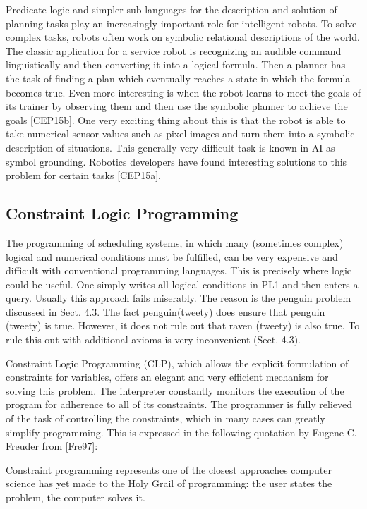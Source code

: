 \documentclass[10pt]{article}
\begin{document}
Predicate logic and simpler sub-languages for the description and solution of planning tasks play an increasingly important role for intelligent robots. To solve complex tasks, robots often work on symbolic relational descriptions of the world. The classic application for a service robot is recognizing an audible command linguistically and then converting it into a logical formula. Then a planner has the task of finding a plan which eventually reaches a state in which the formula becomes true. Even more interesting is when the robot learns to meet the goals of its trainer by observing them and then use the symbolic planner to achieve the goals [CEP15b]. One very exciting thing about this is that the robot is able to take numerical sensor values such as pixel images and turn them into a symbolic description of situations. This generally very difficult task is known in AI as symbol grounding. Robotics developers have found interesting solutions to this problem for certain tasks [CEP15a].

\subsection*{Constraint Logic Programming}
The programming of scheduling systems, in which many (sometimes complex) logical and numerical conditions must be fulfilled, can be very expensive and difficult with conventional programming languages. This is precisely where logic could be useful. One simply writes all logical conditions in PL1 and then enters a query. Usually this approach fails miserably. The reason is the penguin problem discussed in Sect. 4.3. The fact penguin(tweety) does ensure that penguin (tweety) is true. However, it does not rule out that raven (tweety) is also true. To rule this out with additional axioms is very inconvenient (Sect. 4.3).

Constraint Logic Programming (CLP), which allows the explicit formulation of constraints for variables, offers an elegant and very efficient mechanism for solving this problem. The interpreter constantly monitors the execution of the program for adherence to all of its constraints. The programmer is fully relieved of the task of controlling the constraints, which in many cases can greatly simplify programming. This is expressed in the following quotation by Eugene C. Freuder from [Fre97]:

\begin{displayquote}
Constraint programming represents one of the closest approaches computer science has yet made to the Holy Grail of programming: the user states the problem, the computer solves it.
\end{displayquote}
\end{document}
